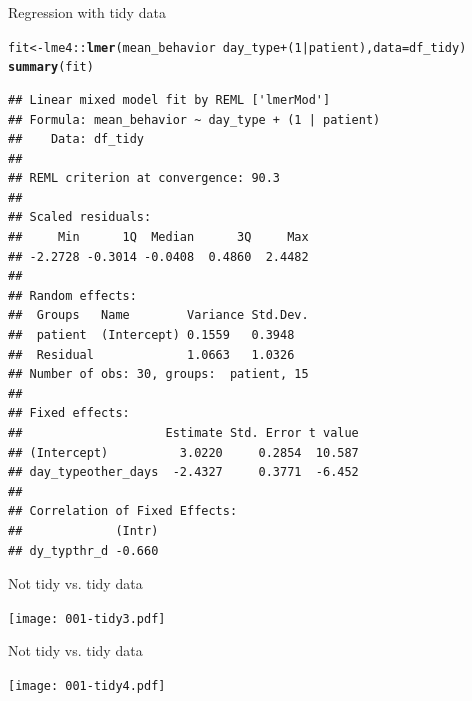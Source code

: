 \documentclass[10pt]{beamer}\usepackage[]{graphicx}\usepackage[]{color}
\makeatletter
\newcommand{\hlnum}[1]{\textcolor[rgb]{0.686,0.059,0.569}{#1}}%
\newcommand{\hlopt}[1]{\textcolor[rgb]{0,0,0}{#1}}%
\newcommand{\hlstd}[1]{\textcolor[rgb]{0.345,0.345,0.345}{#1}}%
\newcommand{\hlkwb}[1]{\textcolor[rgb]{0.69,0.353,0.396}{#1}}%
\newcommand{\hlkwc}[1]{\textcolor[rgb]{0.333,0.667,0.333}{#1}}%
\newcommand{\hlkwd}[1]{\textcolor[rgb]{0.737,0.353,0.396}{\textbf{#1}}}%
\newenvironment{kframe}{%
 \def\at@end@of@kframe{}%
 \ifinner\ifhmode%
  \def\at@end@of@kframe{\end{minipage}}%
  \begin{minipage}{\columnwidth}%
 \fi\fi%
 \def\FrameCommand##1{\hskip\@totalleftmargin \hskip-\fboxsep
 \colorbox{shadecolor}{##1}\hskip-\fboxsep
     \hskip-\linewidth \hskip-\@totalleftmargin \hskip\columnwidth}%
 \MakeFramed {\advance\hsize-\width
   \@totalleftmargin\z@ \linewidth\hsize
   \@setminipage}}%
 {\par\unskip\endMakeFramed%
 \at@end@of@kframe}
\newenvironment{knitrout}{}{} %
\makeatother
\begin{document}
\begin{frame}[fragile]{Regression with tidy data}
	
	
\begin{knitrout}\tiny
{}\color{fgcolor}\begin{kframe}
\begin{alltt}
\hlstd{fit} \hlkwb{<-} \hlstd{lme4}\hlopt{::}\hlkwd{lmer}\hlstd{(mean_behavior} \hlopt{~} \hlstd{day_type} \hlopt{+} \hlstd{(}\hlnum{1}\hlopt{|}\hlstd{patient),} \hlkwc{data} \hlstd{= df_tidy)}
\hlkwd{summary}\hlstd{(fit)}
\end{alltt}
\begin{verbatim}
## Linear mixed model fit by REML ['lmerMod']
## Formula: mean_behavior ~ day_type + (1 | patient)
##    Data: df_tidy
## 
## REML criterion at convergence: 90.3
## 
## Scaled residuals: 
##     Min      1Q  Median      3Q     Max 
## -2.2728 -0.3014 -0.0408  0.4860  2.4482 
## 
## Random effects:
##  Groups   Name        Variance Std.Dev.
##  patient  (Intercept) 0.1559   0.3948  
##  Residual             1.0663   1.0326  
## Number of obs: 30, groups:  patient, 15
## 
## Fixed effects:
##                    Estimate Std. Error t value
## (Intercept)          3.0220     0.2854  10.587
## day_typeother_days  -2.4327     0.3771  -6.452
## 
## Correlation of Fixed Effects:
##             (Intr)
## dy_typthr_d -0.660
\end{verbatim}
\end{kframe}
\end{knitrout}
\end{frame}



\begin{frame}[fragile]{Not tidy vs. tidy data}
	
	
	
	\texttt{[image: 001-tidy3.pdf]}
	
	
	
\end{frame}

\begin{frame}[fragile]{Not tidy vs. tidy data}
	
	
	
	\texttt{[image: 001-tidy4.pdf]}
	
	
	
\end{frame}
\end{document}
